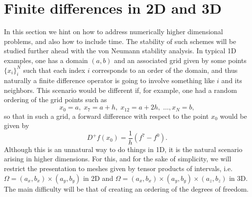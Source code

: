 \section{Finite differences in 2D and 3D}\label{sec:fd-high-dimensions}
In this section we hint on how to address numerically higher dimensional problems, and also how to include time. The stability of such schemes will be studied further ahead with the von Neumann stability analysis. In typical 1D examples, one has a domain $(a,b)$ and an associated grid given by some points $\{x_i\}_i^N$ such that each index $i$ corresponds to an order of the domain, and thus naturally a finite difference operator is going to involve something like $i$ and its neighbors. This scenario would be different if, for example, one had a random ordering of the grid points such as
\begin{equation*}
    x_0 = a,\; x_7 = a + h,\; x_{12} = a + 2h,\; \hdots, x_N = b,
\end{equation*}
so that in such a grid, a forward difference with respect to the point $x_0$ would be given by
\begin{equation*}
    D^+f(x_0) = \frac 1 h \left( f^7 - f^0 \right).
\end{equation*}
Although this is an unnatural way to do things in 1D, it is the natural scenario arising in higher dimensions. For this, and for the sake of simplicity, we will restrict the presentation to meshes given by tensor products of intervals, i.e. $\Omega = (a_x, b_x) \times (a_y, b_y)$ in 2D and $\Omega = (a_x, b_x) \times (a_y, b_y) \times (a_z, b_z)$ in 3D. The main difficulty will be that of creating an ordering of the degrees of freedom.

